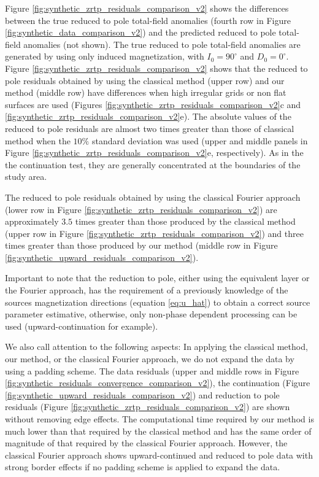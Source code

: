 \documentclass[manuscript,noblind]{geophysics}
\begin{document}
Figure \ref{fig:synthetic_zrtp_residuals_comparison_v2} shows the differences
between the true reduced to pole total-field anomalies (fourth row in Figure
\ref{fig:synthetic_data_comparison_v2}) and the predicted reduced to pole total-field 
anomalies (not shown). The true reduced to pole total-field anomalies are generated by using only induced magnetization, with $I_{0} = 90^{\circ}$ and $D_{0} = 0^{\circ}$.
Figure \ref{fig:synthetic_zrtp_residuals_comparison_v2} shows that the reduced to pole residuals 
obtained by using the classical method (upper row) and our method (middle row) have differences when high irregular grids or non flat surfaces are used (Figures \ref{fig:synthetic_zrtp_residuals_comparison_v2}c and \ref{fig:synthetic_zrtp_residuals_comparison_v2}e). The absolute values of the reduced to pole residuals are almost two
times greater than those of classical method when the $10\%$ standard deviation was used 
(upper and middle panels in Figure \ref{fig:synthetic_zrtp_residuals_comparison_v2}e, respectively).
As in the the continuation test, they are generally concentrated at the boundaries of the study area.


The reduced to pole residuals obtained by using the 
classical Fourier approach (lower row in Figure \ref{fig:synthetic_zrtp_residuals_comparison_v2})
are approximately $3.5$ times greater than those produced by the classical method 
(upper row in Figure \ref{fig:synthetic_zrtp_residuals_comparison_v2}) and three times greater than
those produced by our method (middle row in Figure \ref{fig:synthetic_upward_residuals_comparison_v2}).

Important to note that the reduction to pole, either using the equivalent layer or the Fourier approach, has the requirement of a previously knowledge of the sources magnetization directions (equation \ref{eq:u_hat}) to obtain a correct source parameter estimative, otherwise, only non-phase dependent processing can be used (upward-continuation for example).

We also call attention to the following aspects:
In applying the classical method, our method, or the classical Fourier approach, we do not expand 
the data by using a padding scheme.
The data residuals (upper and middle rows in Figure 
\ref{fig:synthetic_residuals_convergence_comparison_v2}), 
the continuation (Figure \ref{fig:synthetic_upward_residuals_comparison_v2}) and reduction to pole residuals (Figure \ref{fig:synthetic_zrtp_residuals_comparison_v2}) are shown without removing edge effects. 
The computational time required by our method is much lower than that required by the classical method
and has the same order of magnitude of that required by the classical Fourier approach.
However, the classical Fourier approach shows upward-continued and reduced to pole data with strong border effects if no padding scheme is applied to expand the data.
\end{document}
